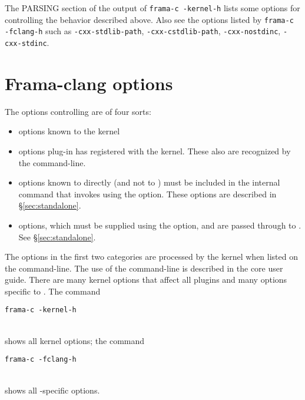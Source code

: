 The PARSING section of the output of \lstinline|frama-c -kernel-h| lists some options for controlling the behavior described above. Also see the options listed by \lstinline|frama-c -fclang-h| such as \lstinline|-cxx-stdlib-path|, \lstinline|-cxx-cstdlib-path|, \lstinline|-cxx-nostdinc|, \lstinline|-cxx-stdinc|.

\section{Frama-clang options}

The options controlling \fclang are of four sorts:
\begin{itemize}
\item options known to the \framac kernel 
\item options  \fcl plug-in has registered with the \fc kernel. These also are recognized by the \fc command-line.
\item options known to \irg directly (and not to \fc) must be 
included in the internal command that invokes \irg using the  option. These options are described in \S\ref{sec:standalone}.
\item \clang options, which must be supplied using the  option, and are passed through \irg to \cl. See \S\ref{sec:standalone}.
\end{itemize}

The options in the first two categories are processed by the \fc kernel when listed on the \fc command-line. 
The use of the \fc command-line is described in the core \fc 
user guide.
There are many kernel options that affect all plugins and many options specific to \fclang.
The command \\
\centerline{\lstinline|frama-c -kernel-h|} \\
shows all kernel options; the command\\
\centerline{\lstinline|frama-c -fclang-h|} \\
shows all \fcl-specific options.

